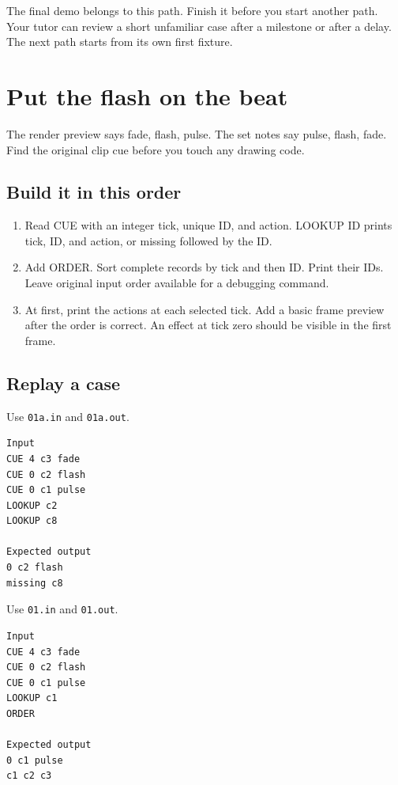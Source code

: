 \documentclass[11pt,letterpaper]{article}
\begin{document}
The final demo belongs to this path. Finish it before you start another path. Your tutor can review a short unfamiliar case after a milestone or after a delay. The next path starts from its own first fixture.

\clearpage

\section{Put the flash on the beat}\label{visuals:01}

The render preview says fade, flash, pulse. The set notes say pulse, flash, fade. Find the original clip cue before you touch any drawing code.

\subsection*{Build it in this order}

\begin{enumerate}
\item Read CUE with an integer tick, unique ID, and action. LOOKUP ID prints tick, ID, and action, or missing followed by the ID.
\item Add ORDER. Sort complete records by tick and then ID. Print their IDs. Leave original input order available for a debugging command.
\item At first, print the actions at each selected tick. Add a basic frame preview after the order is correct. An effect at tick zero should be visible in the first frame.
\end{enumerate}

\subsection*{Replay a case}

Use \texttt{01a.in} and \texttt{01a.out}.

\begin{samepage}
\small
\begin{verbatim}
Input
CUE 4 c3 fade
CUE 0 c2 flash
CUE 0 c1 pulse
LOOKUP c2
LOOKUP c8

Expected output
0 c2 flash
missing c8
\end{verbatim}
\end{samepage}

Use \texttt{01.in} and \texttt{01.out}.

\begin{samepage}
\small
\begin{verbatim}
Input
CUE 4 c3 fade
CUE 0 c2 flash
CUE 0 c1 pulse
LOOKUP c1
ORDER

Expected output
0 c1 pulse
c1 c2 c3
\end{verbatim}
\end{samepage}
\end{document}
